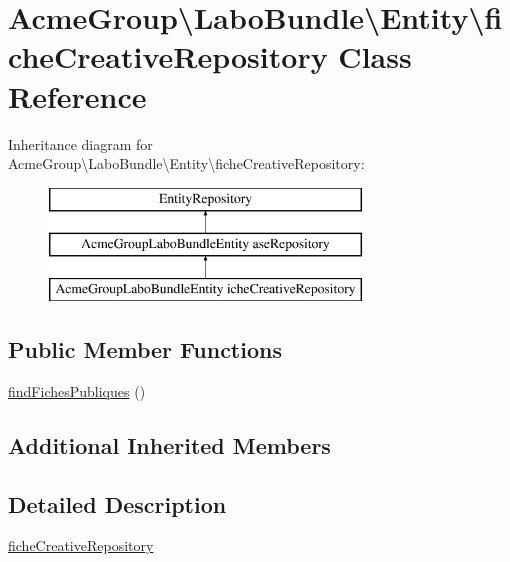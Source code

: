 \hypertarget{class_acme_group_1_1_labo_bundle_1_1_entity_1_1fiche_creative_repository}{\section{Acme\+Group\textbackslash{}Labo\+Bundle\textbackslash{}Entity\textbackslash{}fiche\+Creative\+Repository Class Reference}
\label{class_acme_group_1_1_labo_bundle_1_1_entity_1_1fiche_creative_repository}
}
Inheritance diagram for Acme\+Group\textbackslash{}Labo\+Bundle\textbackslash{}Entity\textbackslash{}fiche\+Creative\+Repository\+:\begin{figure}[H]
\begin{center}
\leavevmode
\includegraphics[height=3.000000cm]{class_acme_group_1_1_labo_bundle_1_1_entity_1_1fiche_creative_repository}
\end{center}
\end{figure}
\subsection*{Public Member Functions}
\begin{DoxyCompactItemize}
\item 
\hyperlink{class_acme_group_1_1_labo_bundle_1_1_entity_1_1fiche_creative_repository_a031625401e9e7ffe9dd670b847deddd1}{find\+Fiches\+Publiques} ()
\end{DoxyCompactItemize}
\subsection*{Additional Inherited Members}


\subsection{Detailed Description}
\hyperlink{class_acme_group_1_1_labo_bundle_1_1_entity_1_1fiche_creative_repository}{fiche\+Creative\+Repository}

